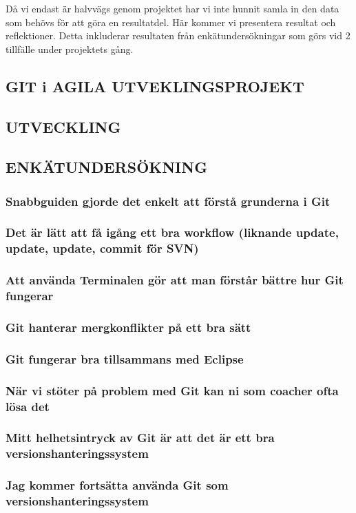 Då vi endast är halvvägs genom projektet har vi inte hunnit samla in den data som behövs för att göra en resultatdel. Här kommer vi presentera resultat och reflektioner. Detta inkluderar resultaten från enkätundersökningar som görs vid 2 tillfälle under projektets gång. 

\subsection{GIT i AGILA UTVEKLINGSPROJEKT}
\subsection{UTVECKLING}
\subsection{ENKÄTUNDERSÖKNING}

\subsubsection{Snabbguiden gjorde det enkelt att förstå grunderna i Git}

\subsubsection{Det är lätt att få igång ett bra workflow (liknande update, update, update, commit för SVN)}


\subsubsection{Att använda Terminalen gör att man förstår bättre hur Git fungerar}


\subsubsection{Git hanterar mergkonflikter på ett bra sätt}


\subsubsection{Git fungerar bra tillsammans med Eclipse}


\subsubsection{När vi stöter på problem med Git kan ni som coacher ofta lösa det}


\subsubsection{Mitt helhetsintryck av Git är att det är ett bra versionshanteringssystem}


\subsubsection{Jag kommer fortsätta använda Git som versionshanteringssystem}


